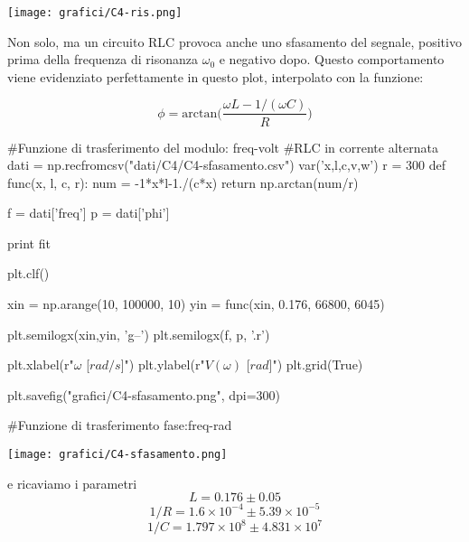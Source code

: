 \begin{center}
\texttt{[image: grafici/C4-ris.png]}
\end{center}

Non solo, ma un circuito RLC provoca anche uno sfasamento del segnale, positivo prima della frequenza di risonanza $\omega_0$ e negativo dopo.
Questo comportamento viene evidenziato perfettamente in questo plot, interpolato con la funzione:

$$\phi=\text{arctan}\Big(\frac{\omega L -1/(\omega C)}{R}\Big)$$


\begin{sagesilent}

#Funzione di trasferimento del modulo: freq-volt
#RLC in corrente alternata
dati = np.recfromcsv("dati/C4/C4-sfasamento.csv")
var('x,l,c,v,w')
r = 300
def func(x, l, c, r):
    num = -1*x*l-1./(c*x)
    return np.arctan(num/r)

f = dati['freq']
p = dati['phi']

print fit

plt.clf()

xin = np.arange(10, 100000, 10)
yin = func(xin, 0.176, 66800, 6045)

plt.semilogx(xin,yin, 'g--')
plt.semilogx(f, p, '.r')

plt.xlabel(r"$\omega$ [$rad/s$]")
plt.ylabel(r"$V(\omega)$ [$rad$]")
plt.grid(True)

plt.savefig("grafici/C4-sfasamento.png", dpi=300)

#Funzione di trasferimento fase:freq-rad
  
\end{sagesilent}

\begin{center}
\texttt{[image: grafici/C4-sfasamento.png]}
\end{center}
e ricaviamo i parametri
$$L = 0.176\pm 0.05$$
$$1/R = 1.6\times 10^{-4} \pm 5.39\times 10^{-5}$$
$$1/C = 1.797\times 10^8\pm4.831\times 10^7$$
